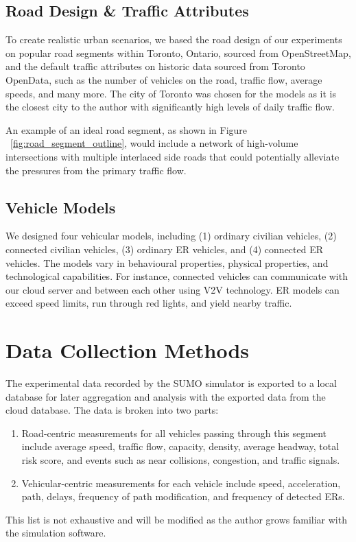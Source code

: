 	\subsection{Road Design \& Traffic Attributes}
		To create realistic urban scenarios, we based the road design of our experiments on popular road segments within Toronto, Ontario, sourced from OpenStreetMap, and the default traffic attributes on historic data sourced from Toronto OpenData, such as the number of vehicles on the road, traffic flow, average speeds, and many more. The city of Toronto was chosen for the models as it is the closest city to the author with significantly high levels of daily traffic flow.
	
		An example of an ideal road segment, as shown in Figure ~\ref{fig:road_segment_outline}, would include a network of high-volume intersections with multiple interlaced side roads that could potentially alleviate the pressures from the primary traffic flow.
	
	
	\subsection{Vehicle Models}
		We designed four vehicular models, including (1) ordinary civilian vehicles, (2) connected civilian vehicles, (3) ordinary ER vehicles, and (4) connected ER vehicles. The models vary in behavioural properties, physical properties, and technological capabilities. For instance, connected vehicles can communicate with our cloud server and between each other using V2V technology. ER models can exceed speed limits, run through red lights, and yield nearby traffic.

\section{Data Collection Methods}
	The experimental data recorded by the SUMO simulator is exported to a local database for later aggregation and analysis with the exported data from the cloud database. The data is broken into two parts:
	\begin{enumerate}
		\item Road-centric measurements for all vehicles passing through this segment include average speed, traffic flow, capacity, density, average headway, total risk score, and events such as near collisions, congestion, and traffic signals.
		\item Vehicular-centric measurements for each vehicle include speed, acceleration, path, delays, frequency of path modification, and frequency of detected ERs.
	\end{enumerate}
 	This list is not exhaustive and will be modified as the author grows familiar with the simulation software.
	

